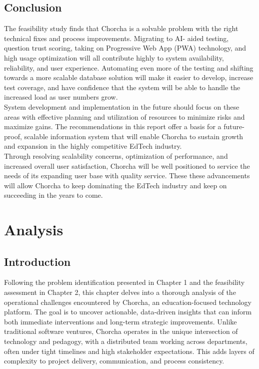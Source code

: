 \documentclass[12pt,a4paper,oneside]{book}
\begin{document}
\section{Conclusion}
The feasibility study finds that Chorcha is a solvable problem
with the right technical fixes and process improvements. Migrating to AI-
aided testing, question trust scoring, taking on Progressive Web App (PWA) technology, and high usage optimization will all contribute highly to system availability, reliability, and user experience. Automating even more of the testing and shifting towards a more scalable database solution will make it easier to develop, increase test coverage, and have confidence that the system will be able to handle the increased load as user numbers grow.\\
System development and implementation in the future should focus on these areas with effective planning and utilization of resources to minimize risks and maximize gains. The recommendations in this report offer a basis for a future-proof, scalable information system that will enable Chorcha to sustain growth and expansion in the highly competitive EdTech industry.\\
Through resolving scalability concerns, optimization of performance, and increased overall user satisfaction, Chorcha will be well positioned to service the needs of its expanding user base with quality service. These
these advancements will allow Chorcha to keep dominating the EdTech industry and keep on succeeding in the years to come.
\newpage


\chapter{Analysis}



\section{Introduction}

Following the problem identification presented in Chapter 1 and the feasibility assessment in Chapter 2, this chapter delves into a thorough analysis of the operational challenges encountered by Chorcha, an education-focused technology platform. The goal is to uncover actionable, data-driven insights that can inform both immediate interventions and long-term strategic improvements. Unlike traditional software ventures, Chorcha operates in the unique intersection of technology and pedagogy, with a distributed team working across departments, often under tight timelines and high stakeholder expectations. This adds layers of complexity to project delivery, communication, and process consistency.
\end{document}
